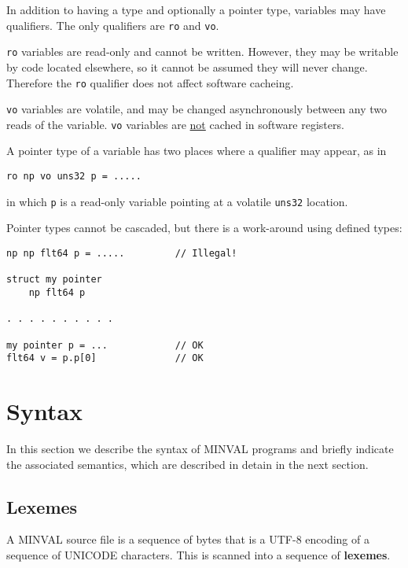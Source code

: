 \documentclass[12pt]{article}
\newcommand{\skey}[2]{{\rm \bfseries #1#2}}
\newenvironment{indpar}[1][0.3in]%
	{\begin{list}{}%
		     {\setlength{\itemsep}{0in}%
		      \setlength{\topsep}{0in}%
		      \setlength{\parsep}{1ex}%
		      \setlength{\labelwidth}{#1}%
		      \setlength{\leftmargin}{#1}%
		      \addtolength{\leftmargin}{\labelsep}}%
	 \item}%
	{\end{list}}
\begin{document}
In addition to having a type and optionally a pointer type,
variables may have qualifiers.  The only qualifiers are
{\tt ro} and {\tt vo}.

{\tt ro} variables are read-only and
cannot be written.  However, they may be writable by
code located elsewhere, so it cannot be assumed they will
never change.  Therefore the {\tt ro} qualifier does not
affect software cacheing.

{\tt vo} variables are volatile, and may be changed asynchronously
between any two reads of the variable.  {\tt vo} variables are
\underline{not} cached in software registers.

A pointer type of a variable
has two places where a qualifier may appear, as in

\begin{indpar}\begin{verbatim}
ro np vo uns32 p = .....
\end{verbatim}\end{indpar}
in which {\tt p} is a read-only variable pointing at a volatile
{\tt uns32} location.

Pointer types cannot be cascaded, but there is a work-around
using defined types:
\begin{indpar}\begin{verbatim}
np np flt64 p = .....         // Illegal!

struct my pointer
    np flt64 p

. . . . . . . . . .

my pointer p = ...            // OK
flt64 v = p.p[0]              // OK
\end{verbatim}\end{indpar}


\section{Syntax}

In this section we describe the syntax of MINVAL programs
and briefly indicate the associated semantics, which are
described in detain in the next section.

\subsection{Lexemes}
\label{LEXEMES}

A MINVAL source file is a sequence of bytes that is a UTF-8 encoding
of a sequence of UNICODE characters.  This is scanned into a sequence
of \skey{lexeme}s.
\end{document}
